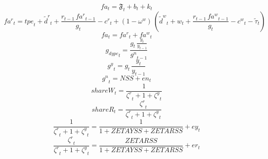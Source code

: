 \begin{dmath}
{{fa}}_{t}={{\mathfrak{F}}}_{t}+{{b}}_{t}+{{k}}_{t}
\end{dmath}
\begin{dmath}
{{fa^r}}_{t}={{tpe}}_{t}+{\tilde{d}^r}_{t}+\frac{{{r}}_{t-1}\, {{fa^r}}_{t-1}}{{{g}}_{t}}-{{c^r}}_{t}+\left(1-{{\omega^w}}\right)\, \left({\tilde{d}^w}_{t}+{{w}}_{t}+\frac{{{r}}_{t-1}\, {{fa^w}}_{t-1}}{{{g}}_{t}}-{{c^w}}_{t}-{\tilde{\tau}}_{t}\right)
\end{dmath}
\begin{dmath}
{{fa}}_{t}={{fa^r}}_{t}+{{fa^w}}_{t}
\end{dmath}
\begin{dmath}
{{g_{dypc}}}_{t}=\frac{{{g}}_{t}\, \frac{{{y}}_{t}}{{{y}}_{t-1}}}{{{g^n}}_{t-1}}
\end{dmath}
\begin{dmath}
{{g^y}}_{t}={{g}}_{t}\, \frac{{{y}}_{t}}{{{y}}_{t-1}}
\end{dmath}
\begin{dmath}
{{g^n}}_{t}={{NSS}}+{{en}}_{t}
\end{dmath}
\begin{dmath}
{{shareW}}_{t}=\frac{1}{{{\zeta^{r}}}_{t}+1+{{\zeta^{y}}}_{t}}
\end{dmath}
\begin{dmath}
{{shareR}}_{t}=\frac{{{\zeta^{r}}}_{t}}{{{\zeta^{r}}}_{t}+1+{{\zeta^{y}}}_{t}}
\end{dmath}
\begin{dmath}
\frac{1}{{{\zeta^{r}}}_{t}+1+{{\zeta^{y}}}_{t}}=\frac{1}{1+{{ZETAYSS}}+{{ZETARSS}}}+{{ey}}_{t}
\end{dmath}
\begin{dmath}
\frac{{{\zeta^{r}}}_{t}}{{{\zeta^{r}}}_{t}+1+{{\zeta^{y}}}_{t}}=\frac{{{ZETARSS}}}{1+{{ZETAYSS}}+{{ZETARSS}}}+{{er}}_{t}
\end{dmath}
